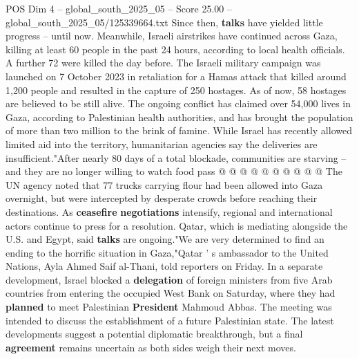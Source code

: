 \begin{textsample}{POS Dim 4 – global\_south\_2025\_05 – Score 25.00 – global\_south\_2025\_05/125339664.txt}
Since then, \textbf{talks} have yielded little progress -- until now.
Meanwhile, Israeli airstrikes have continued across Gaza, killing at least 60 people in the past 24 hours, according to local health officials.
A further 72 were killed the day before.
The Israeli military campaign was launched on 7 October 2023 in retaliation for a Hamas attack that killed around 1,200 people and resulted in the capture of 250 hostages.
As of now, 58 hostages are believed to be still alive.
The ongoing conflict has claimed over 54,000 lives in Gaza, according to Palestinian health authorities, and has brought the population of more than two million to the brink of famine.
While Israel has recently allowed limited aid into the territory, humanitarian agencies say the deliveries are insufficient."After nearly 80 days of a total blockade, communities are starving -- and they are no longer willing to watch food pass @ @ @ @ @ @ @ @ @ @ The UN agency noted that 77 trucks carrying flour had been allowed into Gaza overnight, but were intercepted by desperate crowds before reaching their destinations.
As \textbf{ceasefire} \textbf{negotiations} intensify, regional and international actors continue to press for a resolution.
Qatar, which is mediating alongside the U.S. and Egypt, said \textbf{talks} are ongoing."We are very determined to find an ending to the horrific situation in Gaza,"Qatar ' s ambassador to the United Nations, Ayla Ahmed Saif al-Thani, told reporters on Friday.
In a separate development, Israel blocked a \textbf{delegation} of foreign ministers from five Arab countries from entering the occupied West Bank on Saturday, where they had \textbf{planned} to meet Palestinian \textbf{President} Mahmoud Abbas.
The meeting was intended to discuss the establishment of a future Palestinian state.
The latest developments suggest a potential diplomatic breakthrough, but a final \textbf{agreement} remains uncertain as both sides weigh their next moves.

\end{textsample}
